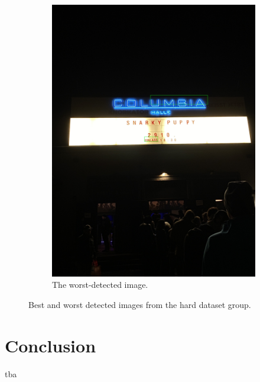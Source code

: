 \documentclass[10pt, a4paper]{article}
\begin{document}
\begin{figure}[h!]
\begin{subfigure}[b]{0.4\linewidth}
		\includegraphics[width=\linewidth]{jupyter/results/hard/sample_output_0.jpeg}
		\caption{The worst-detected image.}
	\end{subfigure}
	\caption{Best and worst detected images from the hard dataset group.}
	\label{fig:samplehardbestworst}
  \end{figure}

\section{Conclusion} %
\label{sec:conclusion}
tba
\clearpage
\newpage 


\end{document}
